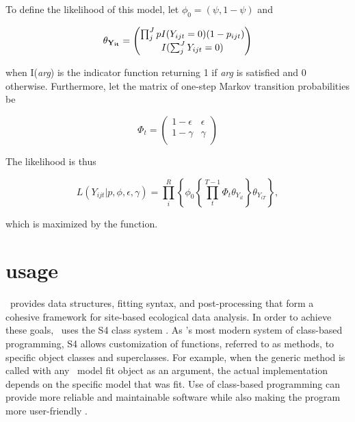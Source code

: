\documentclass[article,shortnames]{jss}
\newcommand{\um}{\pkg{unmarked}}
\newcommand{\rlang}{\proglang{R}}
\begin{document}
To define the likelihood of this model, let $\phi_0 = (\psi, 1-\psi)$ and 

\begin{equation}
  \theta_{{\bf Y_{it}}} =
  \begin{pmatrix}
    \prod_{j}^{J} p I(Y_{ijt}=0)(1-p_{ijt}) \\
    I(\sum_{j}^{J} Y_{ijt}=0) \\
  \end{pmatrix}
\end{equation}

when I({\it arg}) is the indicator function returning 1 if {\it arg} is 
satisfied and 0 otherwise. Furthermore, let  the matrix of one-step Markov 
transition probabilities be 

\begin{equation}
  \Phi_t =
  \begin{pmatrix}
    1-\epsilon & \epsilon \\
    1-\gamma & \gamma\\
  \end{pmatrix}
\end{equation}

The likelihood is thus

\begin{equation}
L(Y_{ijt}| p,\phi,\epsilon,\gamma) = 
 \prod_{i}^{R} \left\{
    \phi_0 \left\{ \prod_{t}^{T-1} \Phi_t \theta_{Y_{it}}  
        \right\} \theta_{Y_{iT}} \right\},
\end{equation}

which is maximized by the  function. 


\section[unmarked usage]{ usage}
\label{sec:unmarked-usage}

\um\ provides data structures, fitting syntax, and post-processing that form a
cohesive framework for site-based ecological data analysis.  In order
to achieve these goals, \um\ uses the S4 class system
\citep{Chambers2008}. As \rlang's most modern system of class-based
programming, S4 allows customization of functions, referred to as
methods, to specific object classes and superclasses. For example,
when the generic  method is called with any \um\ model
fit object as an argument, the actual  implementation
depends on the specific model that was fit.  Use of class-based
programming can provide more reliable and maintainable software while
also making the program more user-friendly \citep{Chambers2008}.
\end{document}
